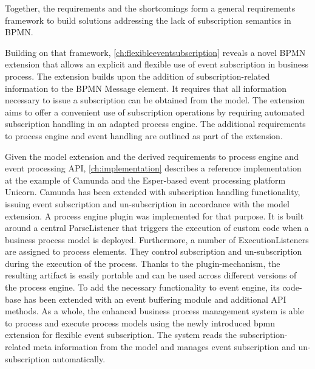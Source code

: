 Together, the requirements and the shortcomings form a general requirements framework to build solutions addressing the lack of subscription semantics in BPMN.


Building on that framework, \autoref{ch:flexibleeventsubscription} reveals a novel BPMN extension that allows an explicit and flexible use of event subscription in business process.
The extension builds upon the addition of subscription-related information to the BPMN Message element. It requires that all information necessary to issue a subscription can be obtained from the model.
The extension aims to offer a convenient use of subscription operations by requiring automated subscription handling in an adapted process engine.
The additional requirements to process engine and event handling are outlined as part of the extension.

Given the model extension and the derived requirements to process engine and event processing API, \autoref{ch:implementation} describes a reference implementation at the example of Camunda and the Esper-based event processing platform Unicorn.
Camunda has been extended with subscription handling functionality, issuing event subscription and un-subscription in accordance with the model extension.
A process engine plugin was implemented for that purpose. It is built around a central ParseListener that triggers the execution of custom code when a business process model is deployed. Furthermore, a number of ExecutionListeners are assigned to process elements. They control subscription and un-subscription during the execution of the process.
Thanks to the plugin-mechanism, the resulting artifact is easily portable and can be used across different versions of the process engine.
To add the necessary functionality to event engine, its code-base has been extended with an event buffering module and additional API methods.
As a whole, the enhanced business process management system is able to process and execute process models using the newly introduced bpmn extension for flexible event subscription.
The system reads the subscription-related meta information from the model and manages event subscription and un-subscription automatically.


